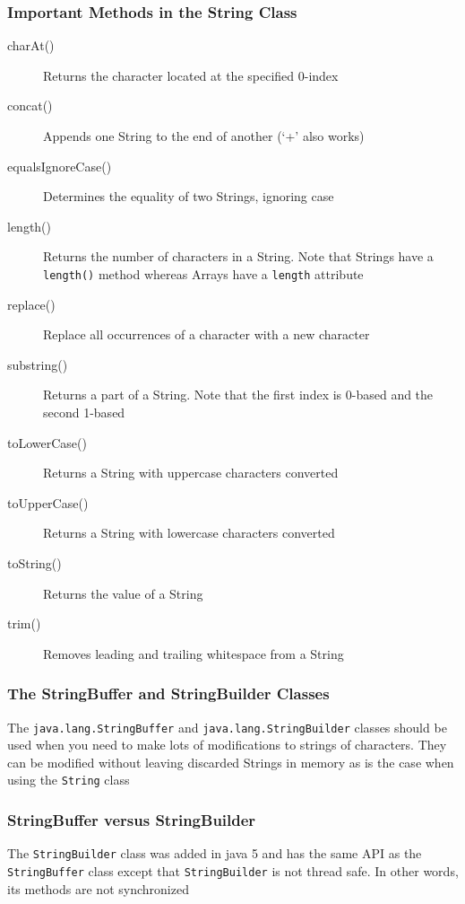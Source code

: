 \subsubsection{Important Methods in the String Class}
\begin{description}
    \item[charAt()] Returns the character located at the specified 0-index
    \item[concat()] Appends one String to the end of another (`+' also works)
    \item[equalsIgnoreCase()] Determines the equality of two Strings, ignoring 
    case
    \item[length()] Returns the number of characters in a String. Note that 
    Strings have a \verb#length()# method whereas Arrays have a \verb#length# 
    attribute
    \item[replace()] Replace all occurrences of a character with a new 
    character
    \item[substring()] Returns a part of a String. Note that the first index is 
    0-based and the second 1-based
    \item[toLowerCase()] Returns a String with uppercase characters converted
    \item[toUpperCase()] Returns a String with lowercase characters converted
    \item[toString()] Returns the value of a String
    \item[trim()] Removes leading and trailing whitespace from a String
\end{description}

\subsubsection{The StringBuffer and StringBuilder Classes}
The \verb#java.lang.StringBuffer# and \verb#java.lang.StringBuilder# classes 
should be used when you need to make lots of modifications to strings of 
characters. They can be modified without leaving discarded Strings in memory as 
is the case when using the \verb#String# class

\subsubsection{StringBuffer versus StringBuilder}
The \verb#StringBuilder# class was added in java 5 and has the same API as the 
\verb#StringBuffer# class except that \verb#StringBuilder# is not thread safe.  
In other words, its methods are not synchronized

